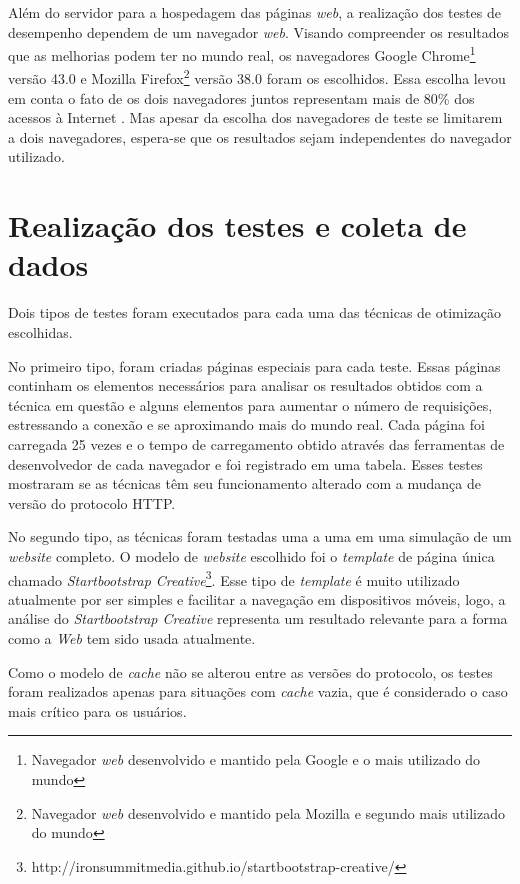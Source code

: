 Além do servidor para a hospedagem das páginas \textit{web}, a realização dos testes de desempenho dependem de um navegador \textit{web}. Visando compreender os resultados que as melhorias podem ter no mundo real, os navegadores Google Chrome\footnote{Navegador \textit{web} desenvolvido e mantido pela Google e o mais utilizado do mundo} versão 43.0 e Mozilla Firefox\footnote{Navegador \textit{web} desenvolvido e mantido pela Mozilla e segundo mais utilizado do mundo} versão 38.0 foram os escolhidos. Essa escolha levou em conta o fato de os dois navegadores juntos representam mais de 80\% dos acessos à Internet \cite{BrowserPopularity}. Mas apesar da escolha dos navegadores de teste se limitarem a dois navegadores, espera-se que os resultados sejam independentes do navegador utilizado.

\section{Realização dos testes e coleta de dados}
\label{sec:realizacaodostestesecoletadedados}

Dois tipos de testes foram executados para cada uma das técnicas de otimização escolhidas.

No primeiro tipo, foram criadas páginas especiais para cada teste. Essas páginas continham os elementos necessários para analisar os resultados obtidos com a técnica em questão e alguns elementos para aumentar o número de requisições, estressando a conexão e se aproximando mais do mundo real. Cada página foi carregada 25 vezes e o tempo de carregamento obtido através das ferramentas de desenvolvedor de cada navegador e foi registrado em uma tabela. Esses testes mostraram se as técnicas têm seu funcionamento alterado com a mudança de versão do protocolo HTTP.

No segundo tipo, as técnicas foram testadas uma a uma em uma simulação de um \textit{website} completo. O modelo de \textit{website} escolhido foi o \textit{template} de página única chamado \textit{Startbootstrap Creative}\footnote{http://ironsummitmedia.github.io/startbootstrap-creative/}. Esse tipo de \textit{template} é muito utilizado atualmente por ser simples e facilitar a navegação em dispositivos móveis, logo, a análise do \textit{Startbootstrap Creative} representa um resultado relevante para a forma como a \textit{Web} tem sido usada atualmente.

Como o modelo de \textit{cache} não se alterou entre as versões do protocolo, os testes foram realizados apenas para situações com \textit{cache} vazia, que é considerado o caso mais crítico para os usuários.

